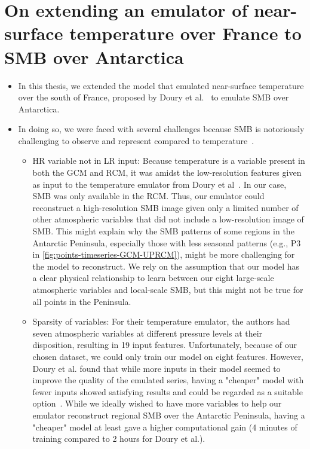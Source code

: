 \documentclass[a4paper,11pt,oneside]{report}
\begin{document}
\section{On extending an emulator of near-surface temperature over France to SMB over Antarctica}\label{sec:extension-doury}
\begin{itemize}
    \item In this thesis, we extended the model that emulated near-surface temperature over the south of France, proposed by Doury et al.~\cite{Doury} to emulate SMB over Antarctica. 
    \item In doing so, we were faced with several challenges because SMB is notoriously challenging to observe and represent compared to temperature~\cite{Lenaerts2019}. 
    \begin{itemize}
        \item HR variable not in LR input: Because temperature is a variable present in both the GCM and RCM, it was amidst the low-resolution features given as input to the temperature emulator from Doury et al~\cite{Doury}. In our case, SMB was only available in the RCM. Thus, our emulator could reconstruct a high-resolution SMB image given only a limited number of other atmospheric variables that did not include a low-resolution image of SMB. This might explain why the SMB patterns of some regions in the Antarctic Peninsula, especially those with less seasonal patterns (e.g., P3 in \autoref{fig:points-timeseries-GCM-UPRCM}), might be more challenging for the model to reconstruct. We rely on the assumption that our model has a clear physical relationship to learn between our eight large-scale atmospheric variables and local-scale SMB, but this might not be true for all points in the Peninsula. 
        \item Sparsity of variables: For their temperature emulator, the authors had seven atmospheric variables at different pressure levels at their disposition, resulting in 19 input features. Unfortunately, because of our chosen dataset, we could only train our model on eight features. However, Doury et al. found that while more inputs in their model seemed to improve the quality of the emulated series, having a "cheaper" model with fewer inputs showed satisfying results and could be regarded as a suitable option~\cite{Doury}. While we ideally wished to have more variables to help our emulator reconstruct regional SMB over the Antarctic Peninsula, having a "cheaper" model at least gave a higher computational gain (4 minutes of training compared to 2 hours for Doury et al.).  

\end{itemize}
\end{itemize}
\end{document}
